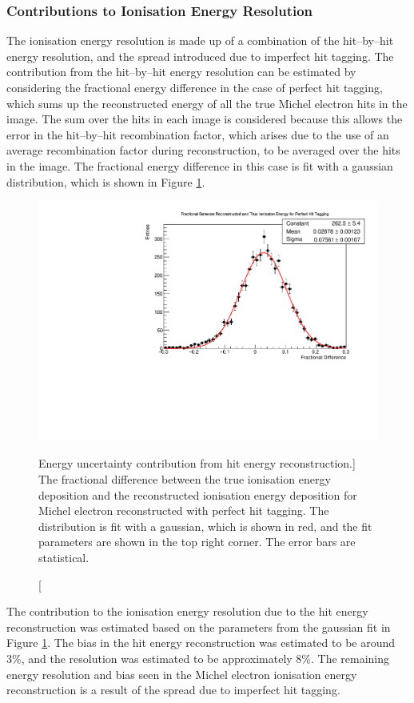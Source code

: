 \subsubsection*{Contributions to Ionisation Energy Resolution}
The ionisation energy resolution is made up of a combination of the hit--by--hit
energy resolution, and the spread introduced due to imperfect hit tagging. The
contribution from the hit--by--hit energy resolution can be estimated by
considering the fractional energy difference in the case of perfect hit tagging,
which sums up the reconstructed energy of all the true Michel electron hits in
the image. The sum over the hits in each image is considered because this
allows the error in the hit--by--hit recombination factor, which arises due to
the use of an average recombination factor during reconstruction, to be 
averaged over the hits in the image. The fractional energy difference in this
case is fit with a gaussian distribution, which is shown in Figure
\ref{fig:michel_hit_res}. 
\begin{figure}
	\centering
	\includegraphics[width=\textwidth]{figures/michel_hit_energy_resolution.pdf}
	\caption
	[Energy uncertainty contribution from hit energy reconstruction.]
	{The fractional difference between the true ionisation energy deposition and
	the reconstructed ionisation energy deposition for Michel electron
	reconstructed with perfect hit tagging. The distribution is fit with a 
	gaussian, which is shown in red, and the fit parameters are shown in the top 
	right corner. The error bars are statistical.}
	\label{fig:michel_hit_res}
\end{figure}

The contribution to the ionisation energy resolution due to the hit energy
reconstruction was estimated based on the parameters from the gaussian fit in
Figure \ref{fig:michel_hit_res}. The bias in the hit energy reconstruction was 
estimated to be around 3\%, and the resolution was estimated to be 
approximately 8\%. The remaining energy resolution and bias seen in the Michel 
electron ionisation energy reconstruction is a result of the spread due to 
imperfect hit tagging.


